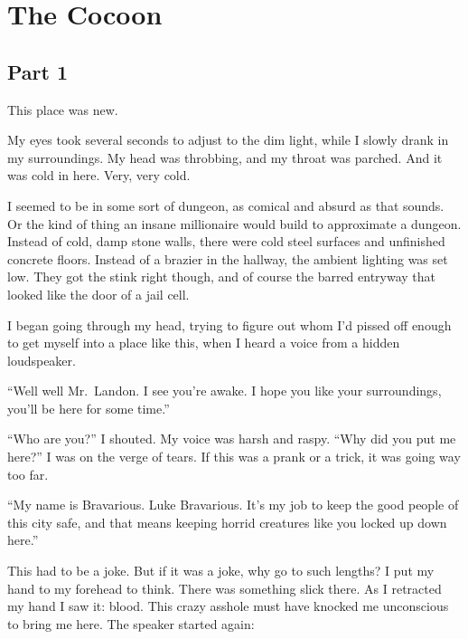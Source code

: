 \chapter{The Cocoon}

\section*{Part 1}

This place was new.



My eyes took several seconds to adjust to the dim light, while I
slowly drank in my surroundings. My head was throbbing, and my
throat was parched. And it was cold in here. Very, very cold.



I seemed to be in some sort of dungeon, as comical and absurd as
that sounds. Or the kind of thing an insane millionaire would build
to approximate a dungeon. Instead of cold, damp stone walls, there
were cold steel surfaces and unfinished concrete floors. Instead of
a brazier in the hallway, the ambient lighting was set low. They
got the stink right though, and of course the barred entryway that
looked like the door of a jail cell.



I began going through my head, trying to figure out whom I'd
pissed off enough to get myself into a place like this, when I
heard a voice from a hidden loudspeaker.



``Well well Mr.\ Landon. I see you're awake. I hope you
like your surroundings, you'll be here for some
time.''



``Who are you?'' I shouted. My voice was harsh and raspy.
``Why did you put me here?'' I was on the verge of tears.
If this was a prank or a trick, it was going way too far.



``My name is Bravarious. Luke Bravarious. It's my job to
keep the good people of this city safe, and that means keeping
horrid creatures like you locked up down here.''



This had to be a joke. But if it was a joke, why go to such
lengths? I put my hand to my forehead to think. There was something
slick there. As I retracted my hand I saw it: blood. This crazy
asshole must have knocked me unconscious to bring me here. The
speaker started again:



